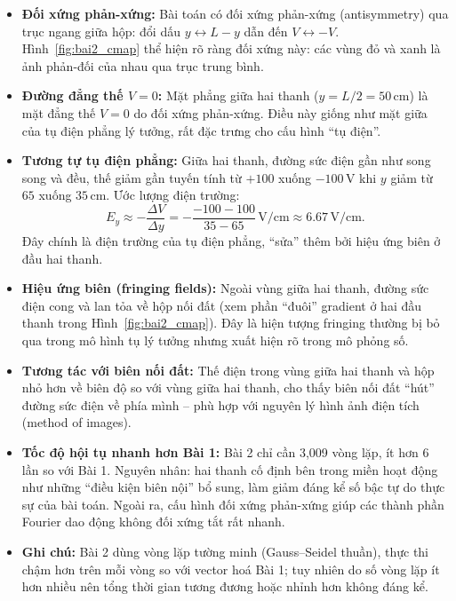 \documentclass[12pt,a4paper]{article}
\begin{document}
\begin{itemize}
    \item \textbf{Đối xứng phản-xứng:} Bài toán có đối xứng phản-xứng (antisymmetry) qua trục ngang giữa hộp: đổi dấu $y \leftrightarrow L - y$ dẫn đến $V \leftrightarrow -V$. Hình~\ref{fig:bai2_cmap} thể hiện rõ ràng đối xứng này: các vùng đỏ và xanh là ảnh phản-đối của nhau qua trục trung bình.

    \item \textbf{Đường đẳng thế $V = 0$:} Mặt phẳng giữa hai thanh ($y = L/2 = 50\,\mathrm{cm}$) là mặt đẳng thế $V = 0$ do đối xứng phản-xứng. Điều này giống như mặt giữa của tụ điện phẳng lý tưởng, rất đặc trưng cho cấu hình ``tụ điện''.

    \item \textbf{Tương tự tụ điện phẳng:} Giữa hai thanh, đường sức điện gần như song song và đều, thế giảm gần tuyến tính từ $+100$ xuống $-100\,\mathrm{V}$ khi $y$ giảm từ $65$ xuống $35\,\mathrm{cm}$. Ước lượng điện trường:
    \[
        E_y \approx -\frac{\Delta V}{\Delta y} = -\frac{-100 - 100}{35 - 65}\,\mathrm{V/cm} \approx 6.67\,\mathrm{V/cm}.
    \]
    Đây chính là điện trường của tụ điện phẳng, ``sửa'' thêm bởi hiệu ứng biên ở đầu hai thanh.

    \item \textbf{Hiệu ứng biên (fringing fields):} Ngoài vùng giữa hai thanh, đường sức điện cong và lan tỏa về hộp nối đất (xem phần ``đuôi'' gradient ở hai đầu thanh trong Hình~\ref{fig:bai2_cmap}). Đây là hiện tượng fringing thường bị bỏ qua trong mô hình tụ lý tưởng nhưng xuất hiện rõ trong mô phỏng số.

    \item \textbf{Tương tác với biên nối đất:} Thế điện trong vùng giữa hai thanh và hộp nhỏ hơn về biên độ so với vùng giữa hai thanh, cho thấy biên nối đất ``hút'' đường sức điện về phía mình -- phù hợp với nguyên lý hình ảnh điện tích (method of images).

    \item \textbf{Tốc độ hội tụ nhanh hơn Bài 1:} Bài 2 chỉ cần 3{,}009 vòng lặp, ít hơn 6 lần so với Bài 1. Nguyên nhân: hai thanh cố định bên trong miền hoạt động như những ``điều kiện biên nội'' bổ sung, làm giảm đáng kể số bậc tự do thực sự của bài toán. Ngoài ra, cấu hình đối xứng phản-xứng giúp các thành phần Fourier dao động không đối xứng tắt rất nhanh.

    \item \textbf{Ghi chú:} Bài 2 dùng vòng lặp tường minh (Gauss--Seidel thuần), thực thi chậm hơn trên mỗi vòng so với vector hoá Bài 1; tuy nhiên do số vòng lặp ít hơn nhiều nên tổng thời gian tương đương hoặc nhỉnh hơn không đáng kể.
\end{itemize}
\end{document}
